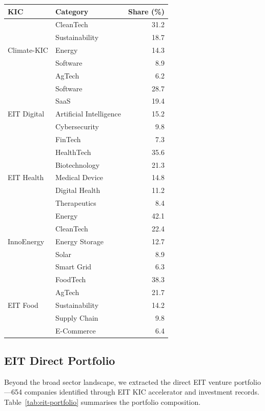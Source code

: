 \documentclass[../main.tex]{subfiles}
\begin{document}
\begin{center}
\small
\begin{tabular}{llr}
\toprule
\textbf{KIC} & \textbf{Category} & \textbf{Share (\%)} \\
\midrule
\multirow{5}{*}{Climate-KIC}
    & CleanTech & 31.2 \\
    & Sustainability & 18.7 \\
    & Energy & 14.3 \\
    & Software & 8.9 \\
    & AgTech & 6.2 \\
\midrule
\multirow{5}{*}{EIT Digital}
    & Software & 28.7 \\
    & SaaS & 19.4 \\
    & Artificial Intelligence & 15.2 \\
    & Cybersecurity & 9.8 \\
    & FinTech & 7.3 \\
\midrule
\multirow{5}{*}{EIT Health}
    & HealthTech & 35.6 \\
    & Biotechnology & 21.3 \\
    & Medical Device & 14.8 \\
    & Digital Health & 11.2 \\
    & Therapeutics & 8.4 \\
\midrule
\multirow{5}{*}{InnoEnergy}
    & Energy & 42.1 \\
    & CleanTech & 22.4 \\
    & Energy Storage & 12.7 \\
    & Solar & 8.9 \\
    & Smart Grid & 6.3 \\
\midrule
\multirow{5}{*}{EIT Food}
    & FoodTech & 38.3 \\
    & AgTech & 21.7 \\
    & Sustainability & 14.2 \\
    & Supply Chain & 9.8 \\
    & E-Commerce & 6.4 \\
\bottomrule
\end{tabular}
\end{center}

\subsection{EIT Direct Portfolio}

Beyond the broad sector landscape, we extracted the direct EIT venture portfolio---654 companies
identified through EIT KIC accelerator and investment records.
Table~\ref{tab:eit-portfolio} summarises the portfolio composition.
\end{document}

